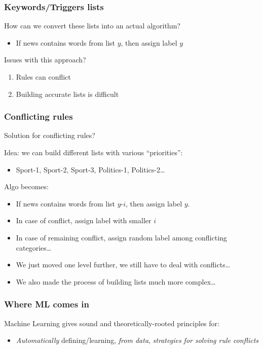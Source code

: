 \documentclass[usenames,dvipsnames]{beamer}
\newcommand{\voc}[1]{\emph{\color{ForestGreen}#1}}
\begin{document}
\begin{frame}\frametitle{Keywords/Triggers lists}

How can we convert these lists into an actual algorithm?
\begin{itemize}
  \item If news contains words from list $y$, then assign label $y$
\end{itemize}

\vspace{0.4cm}
Issues with this approach?
\pause
\begin{enumerate}
  \item Rules can conflict
  \item Building accurate lists is difficult
\end{enumerate}
\end{frame}

\begin{frame}\frametitle{Conflicting rules}

Solution for conflicting rules?
\pause

\vspace{0.4cm}
Idea: we can build different lists with various ``priorities'':
\begin{itemize}
\item Sport-1, Sport-2, Sport-3, Politics-1, Politics-2\ldots
\end{itemize}

\vspace{0.4cm}
Algo becomes:
\begin{itemize}
  \item If news contains words from list $y$-$i$, then assign label $y$.
  \item In case of conflict, assign label with smaller $i$
  \item In case of remaining conflict, assign random label among
    conflicting categories\dots
\end{itemize}

\pause
\vspace{0.4cm}
\begin{itemize}
\item We just moved one level further, we still have to deal with conflicts\dots
\item We also made the process of building lists much more complex\dots
\end{itemize}
\end{frame}


\begin{frame}\frametitle{Where ML comes in}

\begin{block}{Machine Learning gives sound and theoretically-rooted principles for:}
\begin{itemize}
\item \emph{Automatically} defining/learning, \voc{from data}, \voc{strategies for solving rule conflicts}
\end{itemize}
\end{block}

\end{frame}
\end{document}
